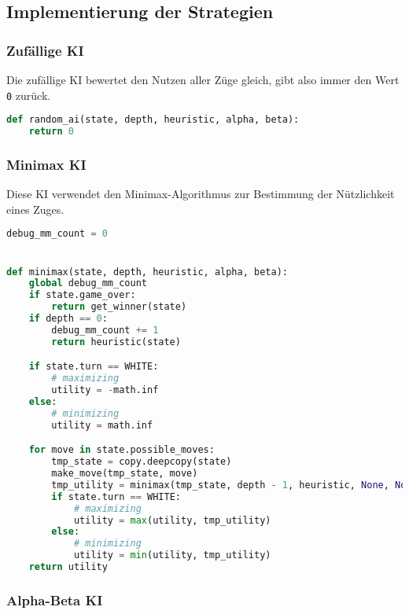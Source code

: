 \hypertarget{implementierung-der-strategien}{%
\subsection{Implementierung der
Strategien}\label{implementierung-der-strategien}}

\hypertarget{zufuxe4llige-ki}{%
\subsubsection{Zufällige KI}\label{zufuxe4llige-ki}}

Die zufällige KI bewertet den Nutzen aller Züge gleich, gibt also immer
den Wert \passthrough{\lstinline!0!} zurück.

\begin{lstlisting}[language=Python]
def random_ai(state, depth, heuristic, alpha, beta):
    return 0
\end{lstlisting}

\hypertarget{minimax-ki}{%
\subsubsection{Minimax KI}\label{minimax-ki}}

Diese KI verwendet den Minimax-Algorithmus zur Bestimmung der
Nützlichkeit eines Zuges.

\begin{lstlisting}[language=Python]
debug_mm_count = 0


def minimax(state, depth, heuristic, alpha, beta):
    global debug_mm_count
    if state.game_over:
        return get_winner(state)
    if depth == 0:
        debug_mm_count += 1
        return heuristic(state)

    if state.turn == WHITE:
        # maximizing
        utility = -math.inf
    else:
        # minimizing
        utility = math.inf

    for move in state.possible_moves:
        tmp_state = copy.deepcopy(state)
        make_move(tmp_state, move)
        tmp_utility = minimax(tmp_state, depth - 1, heuristic, None, None)
        if state.turn == WHITE:
            # maximizing
            utility = max(utility, tmp_utility)
        else:
            # minimizing
            utility = min(utility, tmp_utility)
    return utility
\end{lstlisting}

\hypertarget{alpha-beta-ki}{%
\subsubsection{Alpha-Beta KI}\label{alpha-beta-ki}}

